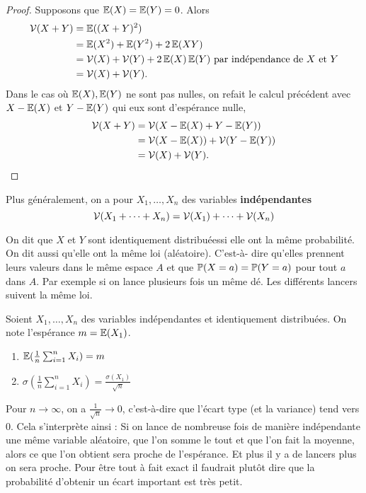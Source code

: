 \begin{proof}
Supposons que $\operatorname{\mathbb E}(X) = \operatorname{\mathbb E}(Y) = 0$. Alors
\begin{align*}
\operatorname{\mathcal V}(X + Y)
& = \operatorname{\mathbb E}((X + Y)^2) \\
& = \operatorname{\mathbb E}(X^2) + \operatorname{\mathbb E}(Y^2) + 2\operatorname{\mathbb E}(XY) \\
& = \operatorname{\mathcal V}(X) + \operatorname{\mathcal V}(Y) + 2\operatorname{\mathbb E}(X)\operatorname{\mathbb E}(Y) \text{ par indépendance de $X$ et $Y$} \\
& = \operatorname{\mathcal V}(X) + \operatorname{\mathcal V}(Y).
\end{align*}
Dans le cas où $\operatorname{\mathbb E}(X), \operatorname{\mathbb E}(Y)$ ne sont pas nulles, on refait le calcul précédent avec $X - \operatorname{\mathbb E}(X)$ et $Y - \operatorname{\mathbb E}(Y)$ qui eux sont d'espérance nulle,
\begin{align*}
\operatorname{\mathcal V}(X + Y)
& = \operatorname{\mathcal V}(X - \operatorname{\mathbb E}(X) + Y - \operatorname{\mathbb E}(Y)) \\
& = \operatorname{\mathcal V}(X - \operatorname{\mathbb E}(X)) + \operatorname{\mathcal V}(Y - \operatorname{\mathbb E}(Y)) \\
& = \operatorname{\mathcal V}(X) + \operatorname{\mathcal V}(Y).
\end{align*}
\end{proof}


Plus généralement, on a pour $X_1, \dots, X_n$ des variables \textbf{indépendantes}
$$\operatorname{\mathcal V}(X_1 + \dots + X_n) = \operatorname{\mathcal V}(X_1) + \dots + \operatorname{\mathcal V}(X_n)$$

On dit que $X$ et $Y$ sont \og identiquement distribuées\fg si elle ont la même probabilité. On dit aussi qu'elle ont la même loi (aléatoire). C'est-à- dire qu'elles prennent leurs valeurs dans le même espace $A$ et que $\operatorname{\mathbb P}(X = a) = \operatorname{\mathbb P}(Y = a)$ pour tout $a$ dans $A$. Par exemple si on lance plusieurs fois un même dé. Les différents lancers suivent la même loi.


\begin{thm}
Soient $X_1, \dots, X_n$ des variables indépendantes et identiquement distribuées. On note l'espérance $m = \operatorname{\mathbb E}(X_1)$.
\begin{enumerate}
\item $\operatorname{\mathbb E}(\frac1n\sum_{i = 1}^nX_i) = m$
\item $\sigma(\frac1n\sum_{i = 1}^nX_i) = \frac{\sigma(X_1)}{\sqrt n}$
\end{enumerate}
\end{thm}

\begin{rem}
Pour $n\rightarrow\infty$, on a $\frac 1{\sqrt n}\rightarrow 0$, c'est-à-dire que l'écart type (et la variance) tend vers $0$. Cela s'interprète ainsi : Si on lance de nombreuse fois de manière indépendante une même variable aléatoire, que l'on somme le tout et que l'on fait la moyenne, alors ce que l'on obtient sera proche de l'espérance. Et plus il y a de lancers plus on sera proche. Pour être tout à fait exact il faudrait plutôt dire que la probabilité d'obtenir un écart important est très petit.
\end{rem}


